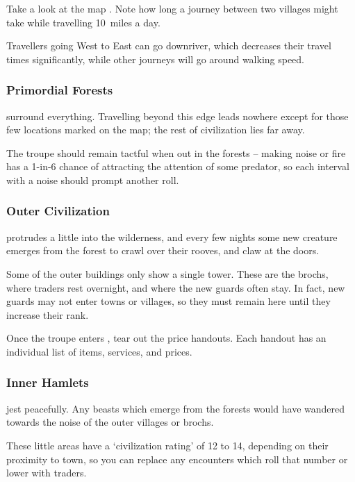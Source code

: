 \begin{multicols}{2}
Take a look at the map .
Note how long a journey between two \glspl{village} might take while travelling 10~miles a day.

Travellers going West to East can go downriver, which decreases their travel times significantly, while other journeys will go around walking speed.

\subsubsection{Primordial Forests}
surround everything.
Travelling beyond this \gls{edge} leads nowhere except for those few locations marked on the map; the rest of civilization lies far away.

The troupe should remain tactful when out in the forests -- making noise or fire has a 1-in-6 chance of attracting the attention of some predator, so each \gls{interval} with a noise should prompt another roll.

\subsubsection{Outer Civilization}
protrudes a little into the wilderness, and every few nights some new creature emerges from the forest to crawl over their rooves, and claw at the doors.

Some of the outer buildings only show a single tower.
These are the \glspl{broch}, where traders rest overnight, and where the new \glspl{guard} often stay.
In fact, new \glspl{guard} may not enter towns or \glspl{village}, so they must remain here until they increase their rank.%

Once the troupe enters , tear out the price handouts.
Each handout has an individual list of items, services, and prices.

\subsubsection{Inner Hamlets}
jest peacefully.
Any beasts which emerge from the forests would have wandered towards the noise of the outer \glspl{village} or \glspl{broch}.

These little areas have a `civilization rating' of 12 to 14, depending on their proximity to town, so you can replace any encounters which roll that number or lower with traders.%

\end{multicols}


\printglossary[
  type=people,
  style=topicmcols,
]


